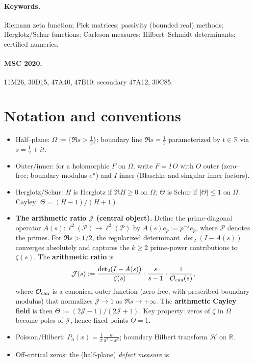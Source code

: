 \documentclass[11pt]{article}
\newcommand{\Hilb}{\mathcal H}
\theoremstyle{definition}
\theoremstyle{remark}
\theoremstyle{definition}
\newcommand{\R}{\mathbb{R}}
\newcommand{\PP}{\mathcal{P}}
\begin{document}
\paragraph{Keywords.} Riemann zeta function; Pick matrices; passivity (bounded real) methods; Herglotz/Schur functions; Carleson measures; Hilbert--Schmidt determinants; certified numerics.

\paragraph{MSC 2020.} 11M26, 30D15, 47A40, 47B10; secondary 47A12, 30C85.

\section*{Notation and conventions}
\begin{itemize}
\item Half–plane: $\Omega:=\{\Re s>\tfrac12\}$; boundary line $\Re s=\tfrac12$ parameterized by $t\in\R$ via $s=\tfrac12+it$.
\item Outer/inner: for a holomorphic $F$ on $\Omega$, write $F=I\,O$ with $O$ outer (zero–free; boundary modulus $e^{u}$) and $I$ inner (Blaschke and singular inner factors).
\item Herglotz/Schur: $H$ is Herglotz if $\Re H\ge 0$ on $\Omega$; $\Theta$ is Schur if $|\Theta|\le 1$ on $\Omega$. Cayley: $\Theta=(H-1)/(H+1)$.
\item \textbf{The arithmetic ratio $\mathcal{J}$ (central object).} Define the prime-diagonal operator $A(s):\ell^2(\PP)\to\ell^2(\PP)$ by $A(s)e_p := p^{-s}e_p$, where $\PP$ denotes the primes. For $\Re s > 1/2$, the regularized determinant $\det_2(I-A(s))$ converges absolutely and captures the $k \ge 2$ prime-power contributions to $\zeta(s)$. The \textbf{arithmetic ratio} is
\[
  \mathcal{J}(s) := \frac{\det_2(I-A(s))}{\zeta(s)} \cdot \frac{s}{s-1} \cdot \frac{1}{\mathcal{O}_{\rm can}(s)},
\]
where $\mathcal{O}_{\rm can}$ is a canonical outer function (zero-free, with prescribed boundary modulus) that normalizes $\mathcal{J} \to 1$ as $\Re s \to +\infty$. The \textbf{arithmetic Cayley field} is then $\Theta := (2\mathcal{J}-1)/(2\mathcal{J}+1)$. Key property: zeros of $\zeta$ in $\Omega$ become poles of $\mathcal{J}$, hence fixed points $\Theta = 1$.
\item Poisson/Hilbert: $P_a(x)=\tfrac{1}{\pi}\tfrac{a}{a^2+x^2}$; boundary Hilbert transform $\Hilb$ on $\R$.
\item Off-critical zeros: the (half-plane) \emph{defect measure} is

\end{itemize}
\end{document}
